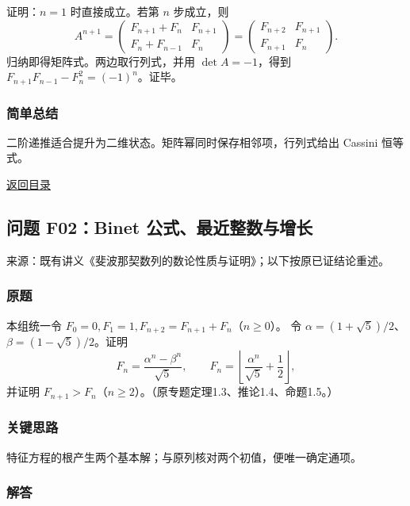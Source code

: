 \documentclass[11pt,a4paper]{article}
\begin{document}
证明：\(n=1\) 时直接成立。若第 \(n\) 步成立，则 \[
A^{n+1}=\begin{pmatrix}F_{n+1}+F_n&F_{n+1}\\F_n+F_{n-1}&F_n\end{pmatrix}
=\begin{pmatrix}F_{n+2}&F_{n+1}\\F_{n+1}&F_n\end{pmatrix}.
\] 归纳即得矩阵式。两边取行列式，并用 \(\det A=-1\)，得到
\(F_{n+1}F_{n-1}-F_n^2=(-1)^n\)。证毕。

\subsubsection{简单总结}\label{ux7b80ux5355ux603bux7ed3-33}

二阶递推适合提升为二维状态。矩阵幂同时保存相邻项，行列式给出 Cassini
恒等式。

\noindent\hyperref[contents]{返回目录}

\subsection{问题 F02：Binet
公式、最近整数与增长}\label{ux95eeux9898-f02binet-ux516cux5f0fux6700ux8fd1ux6574ux6570ux4e0eux589eux957f}

来源：既有讲义《斐波那契数列的数论性质与证明》；以下按原已证结论重述。

\subsubsection{原题}\label{ux539fux9898-34}

本组统一令 \(F_0=0,F_1=1,F_{n+2}=F_{n+1}+F_n\)（\(n\ge0\)）。 令
\(\alpha=(1+\sqrt5)/2\)、\(\beta=(1-\sqrt5)/2\)。证明
\[F_n=\frac{\alpha^n-\beta^n}{\sqrt5},\qquad F_n=\left\lfloor\frac{\alpha^n}{\sqrt5}+\frac12\right\rfloor,\]
并证明
\(F_{n+1}>F_n\)（\(n\ge2\)）。（原专题定理1.3、推论1.4、命题1.5。）

\subsubsection{关键思路}\label{ux5173ux952eux601dux8def-34}

特征方程的根产生两个基本解；与原列核对两个初值，便唯一确定通项。

\subsubsection{解答}\label{ux89e3ux7b54-34}
\end{document}
